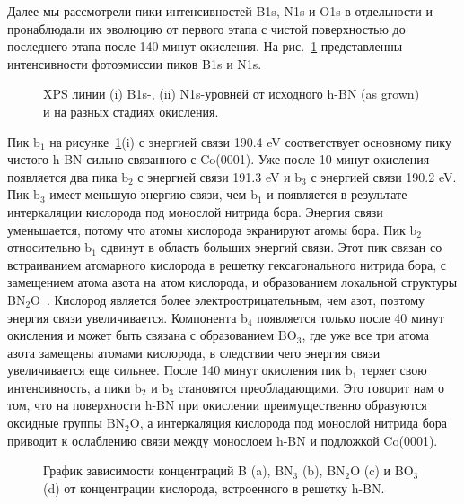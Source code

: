 Далее мы рассмотрели пики интенсивностей B1s, N1s и O1s  в отдельности и пронаблюдали их эволюцию
от первого этапа с чистой поверхностью до последнего этапа после 140 минут окисления. 
На рис.~\ref{pic:B1s_N1s} представленны интенсивности фотоэмиссии пиков B1s и N1s.
\begin{figure}[!ht]
\caption{XPS линии (i) B1s-, (ii) N1s-уровней от исходного h-BN (as grown) и на разных стадиях окисления.}
\label{pic:B1s_N1s}
\end{figure}
Пик $\mathrm{b_1}$ на рисунке~\ref{pic:B1s_N1s}(i) с энергией связи 190.4 eV соответствует основному пику 
чистого h-BN сильно связанного с Co(0001). Уже после 10 минут окисления появляется два пика
$\mathrm{b_2}$ с энергией связи 191.3 eV и $\mathrm{b_3}$ с энергией связи 190.2 eV. Пик $\mathrm{b_3}$  имеет меньшую энергию связи,
чем $\mathrm{b_1}$ и появляется в результате интеркаляции кислорода под монослой нитрида бора. 
Энергия связи уменьшается, потому что атомы кислорода экранируют атомы бора. Пик $\mathrm{b_2}$ 
относительно $\mathrm{b_1}$ сдвинут в область больших энергий связи. Этот пик связан со встраиванием атомарного кислорода
в решетку гексагонального нитрида бора, с замещением атома азота на атом кислорода, и образованием локальной структуры 
$\mathrm{BN_2O}$~\cite{Makarova2019_h-BN/Ni_Oxydation}. Кислород является более электроотрицательным, чем азот, поэтому энергия связи увеличивается.
Компонента $\mathrm{b_4}$ появляется только после 40 минут окисления и может
быть связана с образованием $\mathrm{BO_3}$, где уже все три атома азота замещены атомами кислорода, в следствии чего энергия связи
увеличивается еще сильнее. После 140 минут окисления пик $\mathrm{b_1}$ теряет свою интенсивность, а пики
$\mathrm{b_2}$ и $\mathrm{b_3}$ становятся преобладающими. Это говорит нам о том, что на поверхности h-BN при окислении
преимущественно образуются оксидные группы $\mathrm{BN_2O}$, а интеркаляция кислорода под монослой нитрида бора приводит
к ослаблению связи между монослоем h-BN и подложкой Co(0001).
\begin{figure}[!ht]
\caption{График зависимости концентраций B (a), $\mathrm{BN_3}$ (b), $\mathrm{BN_2O}$ (c) и $\mathrm{BO_3}$ (d) от концентрации 
кислорода, встроенного в решетку h-BN.}
\label{pic:B_BN3_BN2O_BO3_vs_O}
\end{figure}


